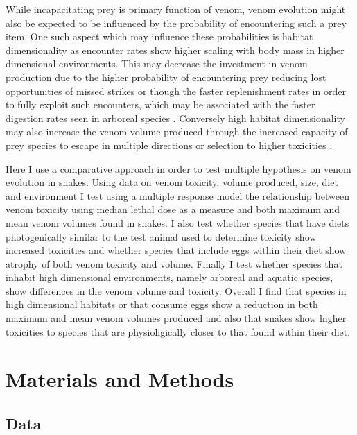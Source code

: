 While incapacitating prey is primary function of venom, venom evolution might also be expected to be influenced by the probability of encountering such a prey item. One such aspect which may influence these probabilities is habitat dimensionality \citep{pawar2012dimensionality} as encounter rates show higher scaling with body mass in higher dimensional environments. This may decrease the investment in venom production due to the higher probability of encountering prey reducing lost opportunities of missed strikes or though the faster replenishment rates in order to fully exploit such encounters, which may be associated with the faster digestion rates seen in arboreal species \citep{lillywhite2002patterns}. Conversely high habitat dimensionality may also increase the venom volume produced through the increased capacity of prey species to escape in multiple directions or selection to higher toxicities \citep{healy2014ecology,moller2010up}. 


Here I use a comparative approach in order to test multiple hypothesis on venom evolution in snakes. Using data on venom toxicity, volume produced, size, diet and environment I test using a multiple response model the relationship between venom toxicity using median lethal dose as a measure and both maximum and mean venom volumes found in snakes. I also test whether species that have diets photogenically similar to the test animal used to determine toxicity show increased toxicities and whether species that include eggs within their diet show atrophy of both venom toxicity and volume. Finally I test whether species that inhabit high dimensional environments, namely arboreal and aquatic species, show differences in the venom volume and toxicity. Overall I find that species in high dimensional habitats or that consume eggs show a reduction in both maximum and mean venom volumes produced and also that snakes show higher toxicities to species that are physioligically closer to that found within their diet.

\section{Materials and Methods}
\subsection{Data}


